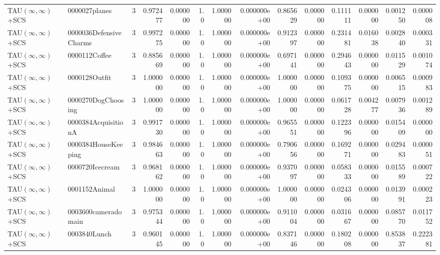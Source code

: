 \begin{tabular}{llrr|r|rr|rr|rr|rrr}
TAU$(\infty, \infty)$+SCS &          0000027planes &       3 & 0.972477 & 0.000000 &  1.0 &      1.000000 & 0.000000e+00 &      0.865629 & 0.000000 &      0.111111 &    0.000000 &     0.001250 &    0.000008 \\
TAU$(\infty, \infty)$+SCS & 0000036DefensiveCharms &       3 & 0.997275 & 0.000000 &  1.0 &      1.000000 & 0.000000e+00 &      0.912397 & 0.000000 &      0.231481 &    0.016038 &     0.002840 &    0.000331 \\
TAU$(\infty, \infty)$+SCS &          0000112Coffee &       3 & 0.885669 & 0.000000 &  1.0 &      1.000000 & 0.000000e+00 &      0.697141 & 0.000000 &      0.294643 &    0.000000 &     0.011529 &    0.001074 \\
TAU$(\infty, \infty)$+SCS &          0000128Outfit &       3 & 1.000000 & 0.000000 &  1.0 &      1.000000 & 0.000000e+00 &      1.000000 & 0.000000 &      0.109375 &    0.000000 &     0.006515 &    0.000983 \\
TAU$(\infty, \infty)$+SCS &     0000270DogChoosing &       3 & 1.000000 & 0.000000 &  1.0 &      1.000000 & 0.000000e+00 &      1.000000 & 0.000000 &      0.061728 &    0.004277 &     0.007936 &    0.001289 \\
TAU$(\infty, \infty)$+SCS &    0000384AcquisitionA &       3 & 0.991730 & 0.000000 &  1.0 &      1.000000 & 0.000000e+00 &      0.965551 & 0.000000 &      0.122396 &    0.000000 &     0.015409 &    0.000000 \\
TAU$(\infty, \infty)$+SCS &    0000384HouseKeeping &       3 & 0.984663 & 0.000000 &  1.0 &      1.000000 & 0.000000e+00 &      0.790656 & 0.000000 &      0.169271 &    0.000000 &     0.029483 &    0.000051 \\
TAU$(\infty, \infty)$+SCS &        0000720Icecream &       3 & 0.968162 & 0.000000 &  1.0 &      1.000000 & 0.000000e+00 &      0.937097 & 0.000000 &      0.058333 &    0.000000 &     0.015589 &    0.000722 \\
TAU$(\infty, \infty)$+SCS &          0001152Animal &       3 & 1.000000 & 0.000000 &  1.0 &      1.000000 & 0.000000e+00 &      1.000000 & 0.000000 &      0.024306 &    0.000000 &     0.013991 &    0.000223 \\
TAU$(\infty, \infty)$+SCS &    0003600cameradomain &       3 & 0.975344 & 0.000000 &  1.0 &      1.000000 & 0.000000e+00 &      0.911004 & 0.000000 &      0.031667 &    0.000000 &     0.085770 &    0.011752 \\
TAU$(\infty, \infty)$+SCS &           0003840Lunch &       3 & 0.960145 & 0.000000 &  1.0 &      1.000000 & 0.000000e+00 &      0.837146 & 0.000000 &      0.180208 &    0.000000 &     0.853837 &    0.222381 \\

\end{tabular}

